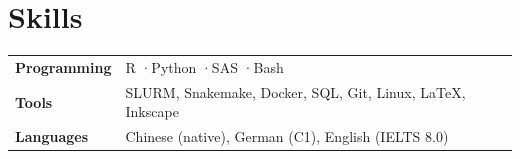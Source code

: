 \documentclass[a4paper,11pt]{article}
\begin{document}
\section*{Skills}

\renewcommand{\arraystretch}{1.3}
\begin{tabularx}{\linewidth}{@{} l X @{}}
\textbf{Programming} & R \enspace·\enspace Python \enspace·\enspace SAS \enspace·\enspace Bash \\
\textbf{Tools} & SLURM, Snakemake, Docker, SQL, Git, Linux, \LaTeX, Inkscape\\
\textbf{Languages} & Chinese (native), German (C1), English (IELTS 8.0)
\end{tabularx}
\renewcommand{\arraystretch}{1.0}
\end{document}
